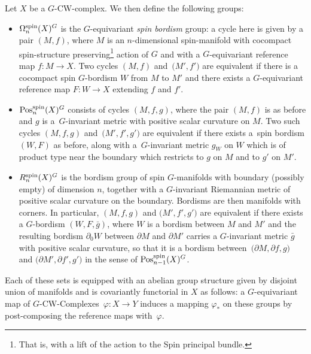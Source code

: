 \documentclass[pdftex]{sigma}
\numberwithin{equation}{section}
\begin{document}
\begin{Definition}\label{def:Stolz_groups}
		Let $X$ be a $G$-CW-complex. We then define the following groups:		
		\begin{itemize}\itemsep=0pt
			\item $\Omega^{\rm spin}_{n}(X)^{G}$ is the $G$-equivariant \textit{spin
				bordism} group: a cycle here is given by a pair $(M,f)$, where $M$ is an
			$n$-dimensional spin-manifold with cocompact spin-structure
			preserving\footnote{That is, with a lift of the action to the Spin principal
				bundle.} action of $G$ and with a $G$-equivariant
			reference map $f\colon M\to X$. Two cycles $(M,f)$ and~$\bigl(M',f'\bigr)$ are
			equivalent if there is a cocompact spin $G$-bordism $W$ from $M$ to $M'$
			and there exists a $G$-equivariant reference map $F\colon W\to X$
			extending $f$ and $f'$.
			\item $\mathrm{Pos}^{\rm spin}_{n}(X)^{G}$ consists of cycles $(M,f,g)$, where the pair
			$(M,f)$ is as before and $g$ is a~$G$-invariant metric with positive
			scalar curvature on $M$. Two such cycles $(M,f,g)$ and~$\bigl(M',f',g'\bigr)$ are
			equivalent if there exists a~spin bordism $(W,F)$ as before, along with a~$G$-invariant metric $g_W$ on $W$ which is of product type near the
			boundary which restricts to $g$ on $M$ and to $g'$ on $M'$.
			\item $R^{\rm spin}_{n}(X)^{G}$ is the bordism group of spin $G$-manifolds with
			boundary (possibly empty) of dimension $n$, together with a $G$-invariant
			Riemannian metric of positive scalar curvature on the boundary. Bordisms are then manifolds with
			corners. In particular, $(M,f,g)$ and $\bigl(M',f',g'\bigr)$ are equivalent if there
			exists a $G$-bordism $(W,F,\bar{g})$, where $W$ is a bordism between $M$
			and $M'$ and the resulting bordism $\partial_0 W$ between $\partial M$ and
			$\partial M'$ carries a $G$-invariant
			metric $\bar{g}$ with positive scalar curvature, so that it is a
			bordism between~${\bigl(\partial M,\partial f,g\bigr)}$ and
			$\bigl(\partial M',\partial f',g'\bigr)$ in the sense of $\mathrm{Pos}^{\rm spin}_{n-1}(X)^{G}$.
		\end{itemize}
		
		Each of these sets is equipped with an abelian group structure given by
		disjoint union of manifolds and is covariantly functorial in $X$ as follows: a $G$-equivariant map of $G$-CW-Complexes~${\varphi\colon X \rightarrow Y}$ induces a mapping $\varphi_{*}$ on these groups
		by post-composing the reference maps with~$\varphi$.
	\end{Definition}
	
\end{document}

